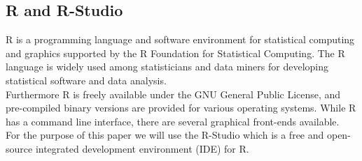 \documentclass{article}
\begin{document}
\subsection{R and R-Studio}
R is a programming language and software environment for statistical computing and graphics supported by the R Foundation for Statistical Computing. The R language is widely used among statisticians and data miners for developing statistical software and data analysis.\\ 
Furthermore R is freely available under the GNU General Public License, and pre-compiled binary versions are provided for various operating systems. While R has a command line interface, there are several graphical front-ends available.\\
For the purpose of this paper we will use the R-Studio which  is a free and open-source integrated development environment (IDE) for R.
\end{document}
